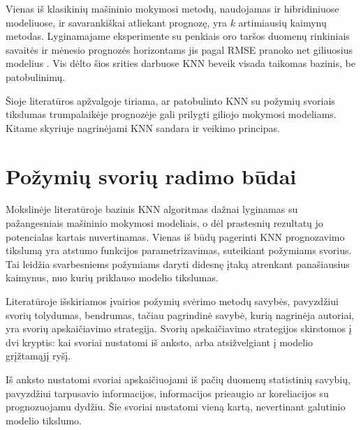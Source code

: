 \documentclass[]{VUMIFTemplateClass}
\begin{document}
    Vienas iš klasikinių mašininio mokymosi metodų, naudojamas ir hibridiniuose modeliuose, ir savarankiškai atliekant  prognozę, yra $k$ artimiausių kaimynų metodas.
    Lyginamajame eksperimente su penkiais oro taršos duomenų rinkiniais savaitės ir mėnesio prognozės horizontams jis pagal RMSE pranoko net giliuosius modelius \cite{das2021}.
    Vis dėlto šios srities darbuose KNN beveik visada taikomas bazinis, be patobulinimų.

    Šioje literatūros apžvalgoje tiriama, ar patobulinto KNN su požymių svoriais tikslumas trumpalaikėje  prognozėje gali prilygti giliojo mokymosi modeliams.
    Kitame skyriuje nagrinėjami KNN sandara ir veikimo principas.


    




    \section{Požymių svorių radimo būdai}
%

    Mokslinėje literatūroje bazinis KNN algoritmas dažnai lyginamas su pažangesniais mašininio mokymosi modeliais, o dėl prastesnių rezultatų jo potencialas kartais nuvertinamas.
    Vienas iš būdų pagerinti KNN prognozavimo tikslumą yra atstumo funkcijos parametrizavimas, suteikiant požymiams svorius.
    Tai leidžia svarbesniems požymiams daryti didesnę įtaką atrenkant panašiausius kaimynus, nuo kurių priklauso modelio tikslumas.

    Literatūroje išskiriamos įvairios požymių svėrimo metodų savybės, pavyzdžiui svorių tolydumas, bendrumas, \cite{wettschereck1997} tačiau pagrindinė savybė, kurią nagrinėja autoriai, yra svorių apskaičiavimo strategija.
    Svorių apskaičiavimo strategijos skirstomos į dvi kryptis: kai svoriai nustatomi iš anksto, arba atsižvelgiant į modelio grįžtamąjį ryšį.

    Iš anksto nustatomi svoriai apskaičiuojami iš pačių duomenų statistinių savybių, pavyzdžiui tarpusavio informacijos, informacijos prieaugio ar koreliacijos su prognozuojamu dydžiu.
    Šie svoriai nustatomi vieną kartą, nevertinant galutinio modelio tikslumo.
\end{document}
